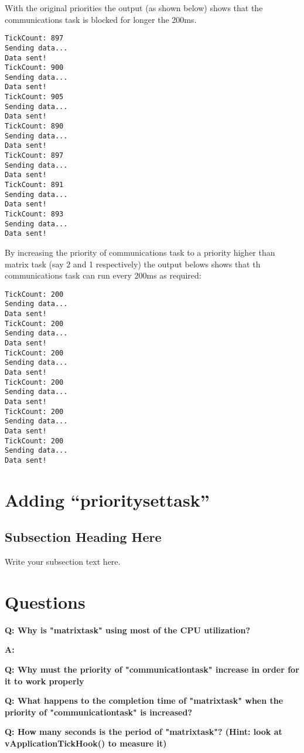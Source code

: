 \documentclass{article}
\newenvironment{qanda}{\setlength{\parindent}{0pt}}{\bigskip}
\newcommand{\Q}{\bigskip\bfseries Q: }
\newcommand{\A}{\par\textbf{A:} \normalfont}
\begin{document}
With the original priorities the output (as shown below) shows that the communications task is blocked for longer the 200ms.

\begin{lstlisting}
TickCount: 897
Sending data...
Data sent!
TickCount: 900
Sending data...
Data sent!
TickCount: 905
Sending data...
Data sent!
TickCount: 890
Sending data...
Data sent!
TickCount: 897
Sending data...
Data sent!
TickCount: 891
Sending data...
Data sent!
TickCount: 893
Sending data...
Data sent!
\end{lstlisting}

By increasing the priority of communications task to a priority higher than matrix task (say 2 and 1 respectively) the output belows shows that th
communications task can run every 200ms as required:

\begin{lstlisting}
TickCount: 200
Sending data...
Data sent!
TickCount: 200
Sending data...
Data sent!
TickCount: 200
Sending data...
Data sent!
TickCount: 200
Sending data...
Data sent!
TickCount: 200
Sending data...
Data sent!
TickCount: 200
Sending data...
Data sent!
\end{lstlisting}


\section{Adding ``prioritysettask''}

\subsection{Subsection Heading Here}
Write your subsection text here.


\section{Questions}

\begin{qanda}

\Q Why is "matrixtask" using most of the CPU utilization?
\A

\Q Why must the priority of "communicationtask" increase in order for it to work properly

\Q What happens to the completion time of "matrixtask" when the priority of "communicationtask" is increased?

\Q How many seconds is the period of "matrixtask"? (Hint: look at vApplicationTickHook() to measure it)

\end{qanda}
\end{document}
